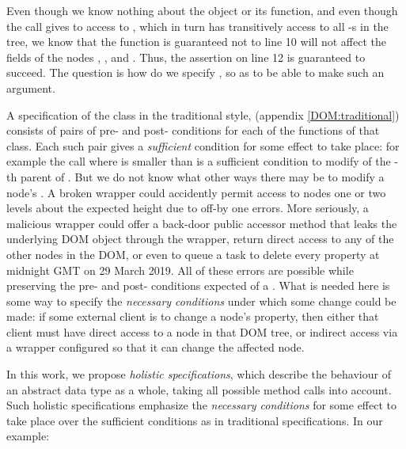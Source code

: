 Even though we know nothing about the  object or
its  function, and even though the call gives
to  access to , which in turn has transitively
access to all -s in the tree, we know that %
the  function is guaranteed not to line 10 will not
affect the  fields of the nodes , ,
and .  Thus, the assertion on line 12 is guaranteed to
succeed.  The question is how do we specify , so as to be
able to make such an argument. %

A specification of the class  in the traditional
style, \eg \cite{Leavens-etal07} (\cf appendix \ref{DOM:traditional})
consists of pairs of pre- and post- conditions for each of the
functions of that class. Each such pair gives a {\em sufficient}
condition for some effect to take place: for example the
call  where  is smaller
than  is a sufficient condition to modify 
of the -th parent of . But we do not know what
other ways there may be to modify a node's .  A broken
wrapper could accidently permit access to nodes one or two levels
about the expected height due to off-by one errors. More seriously,
a malicious wrapper could offer a
back-door public accessor method that leaks the underlying DOM
object through the wrapper, return direct access to any of the
other nodes in the DOM, or even to queue a task to
delete every property at midnight GMT on 29 March 2019. All of these errors are possible while
preserving the pre- and post- conditions expected of a . 
What is needed here is some way to specify the \emph{necessary
conditions}
under which some change could be made: if some external client is to
change a node's property, then either that client must have direct
access to a node in that DOM tree, or indirect access via a wrapper
configured so that it can change the affected node.

In this work, we propose \emph{holistic specifications}, which
describe the behaviour of an abstract data type as a whole, taking all
possible method calls into account. Such holistic specifications
emphasize the \emph{necessary conditions} for some effect to take
place over the sufficient conditions as in traditional
specifications. In our example:

